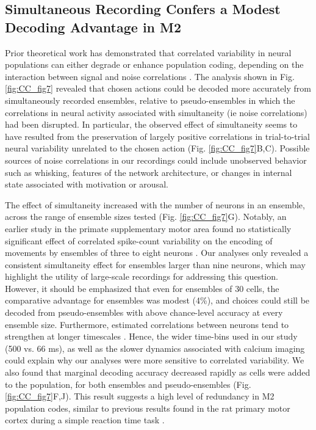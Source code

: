 \subsection[Simultaneous Recording Confers a Modest Decoding Advantage]
{Simultaneous Recording Confers a Modest Decoding Advantage in M2}
Prior theoretical work has demonstrated that correlated variability in neural populations can either degrade or enhance population coding, depending on the interaction between signal and noise correlations \citep{averbeck2003neural, averbeck2006neural}. The analysis shown in Fig. \ref{fig:CC_fig7} revealed that chosen actions could be decoded more accurately from simultaneously recorded ensembles, relative to pseudo-ensembles in which the correlations in neural activity associated with simultaneity (ie noise correlations) had been disrupted. In particular, the observed effect of simultaneity seems to have resulted from the preservation of largely positive correlations in trial-to-trial neural variability unrelated to the chosen action (Fig. \ref{fig:CC_fig7}B,C). Possible sources of noise correlations in our recordings could include unobserved behavior such as whisking, features of the network architecture, or changes in internal state associated with motivation or arousal.

The effect of simultaneity increased with the number of neurons in an ensemble, across the range of ensemble sizes tested (Fig. \ref{fig:CC_fig7}G). Notably, an earlier study in the primate supplementary motor area found no statistically significant effect of correlated spike-count variability on the encoding of movements by ensembles of three to eight neurons \citep{averbeck2006effects}. Our analyses only revealed a consistent simultaneity effect for ensembles larger than nine neurons, which may highlight the utility of large-scale recordings for addressing this question. However, it should be emphasized that even for ensembles of 30 cells, the comparative advantage for ensembles was modest (4\%), and choices could still be decoded from pseudo-ensembles with above chance-level accuracy at every ensemble size. Furthermore, estimated correlations between neurons tend to strengthen at longer timescales \citep{averbeck2003neural}. Hence, the wider time-bins used in our study (500 vs. 66 ms), as well as the slower dynamics associated with calcium imaging could explain why our analyses were more sensitive to correlated variability. We also found that marginal decoding accuracy decreased rapidly as cells were added to the population, for both ensembles and pseudo-ensembles (Fig. \ref{fig:CC_fig7}F,J). This result suggests a high level of redundancy in M2 population codes, similar to previous results found in the rat primary motor cortex during a simple reaction time task \citep{narayanan2005redundancy}.

